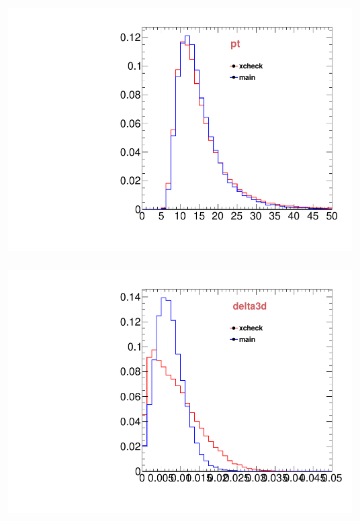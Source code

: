 \begin{figure}
\begin{subfigure}[b]{0.2\textwidth}
                \includegraphics[width=\textwidth]{Figures/VariablesComparison/Data_barrel_figs/pt}
                \label{fig:Data_barrel_pt}
        \end{subfigure}
        \begin{subfigure}[b]{0.2\textwidth}
                \centering
                \includegraphics[width=\textwidth]{Figures/VariablesComparison/Data_barrel_figs/pvip}
                \label{fig:Data_barrel_pvip}
        \end{subfigure}
        \begin{subfigure}[b]{0.2\textwidth}
                \centering

\end{subfigure}
\end{figure}
